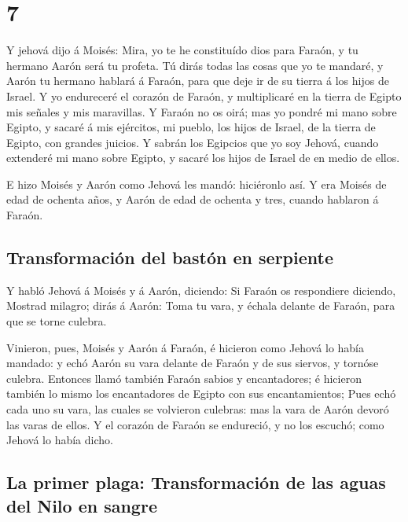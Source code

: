 \hypertarget{section-6}{%
\section{7}\label{section-6}}

 Y jehová dijo á Moisés: Mira, yo te he constituído dios
para Faraón, y tu hermano Aarón será tu profeta.  Tú dirás
todas las cosas que yo te mandaré, y Aarón tu hermano hablará á Faraón,
para que deje ir de su tierra á los hijos de Israel.  Y yo
endureceré el corazón de Faraón, y multiplicaré en la tierra de Egipto
mis señales y mis maravillas.  Y Faraón no os oirá; mas yo
pondré mi mano sobre Egipto, y sacaré á mis ejércitos, mi pueblo, los
hijos de Israel, de la tierra de Egipto, con grandes juicios.
 Y sabrán los Egipcios que yo soy Jehová, cuando extenderé
mi mano sobre Egipto, y sacaré los hijos de Israel de en medio de ellos.

 E hizo Moisés y Aarón como Jehová les mandó: hiciéronlo
así.  Y era Moisés de edad de ochenta años, y Aarón de edad
de ochenta y tres, cuando hablaron á Faraón.

\hypertarget{transformaciuxf3n-del-bastuxf3n-en-serpiente}{%
\subsection{Transformación del bastón en
serpiente}\label{transformaciuxf3n-del-bastuxf3n-en-serpiente}}

 Y habló Jehová á Moisés y á Aarón, diciendo: 
Si Faraón os respondiere diciendo, Mostrad milagro; dirás á Aarón: Toma
tu vara, y échala delante de Faraón, para que se torne culebra.

 Vinieron, pues, Moisés y Aarón á Faraón, é hicieron como
Jehová lo había mandado: y echó Aarón su vara delante de Faraón y de sus
siervos, y tornóse culebra.  Entonces llamó también Faraón
sabios y encantadores; é hicieron también lo mismo los encantadores de
Egipto con sus encantamientos;  Pues echó cada uno su vara,
las cuales se volvieron culebras: mas la vara de Aarón devoró las varas
de ellos.  Y el corazón de Faraón se endureció, y no los
escuchó; como Jehová lo había dicho.

\hypertarget{la-primer-plaga-transformaciuxf3n-de-las-aguas-del-nilo-en-sangre}{%
\subsection{La primer plaga: Transformación de las aguas del Nilo en
sangre}\label{la-primer-plaga-transformaciuxf3n-de-las-aguas-del-nilo-en-sangre}}

